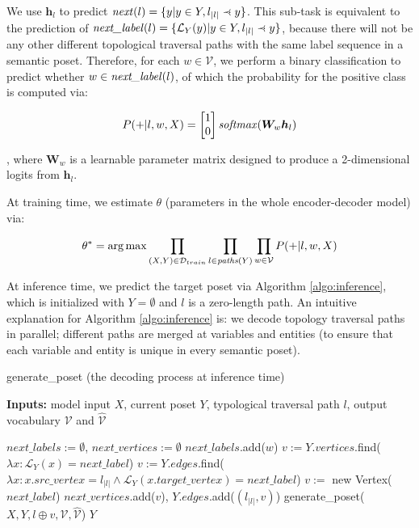 \documentclass{article}
\newcommand{\precdot}{\prec\mathrel{\mkern-5mu}\mathrel{\cdot}}
\begin{document}
We use $\bm{h}_l$ to predict $\text{\emph{next}}(l)=\{y|y\in Y, l_{|l|}\precdot y\}$.
This sub-task is equivalent to the prediction of $\text{\emph{next\_label}}(l)=\{\mathcal{L}_Y(y)|y\in Y, l_{|l|}\precdot y\}$, because there will not be any other different topological traversal paths with the same label sequence in a semantic poset.
Therefore, for each $w\in \mathcal{V}$, we perform a binary classification to predict whether $w\in \text{\emph{next\_label}}(l)$, of which the probability for the positive class is computed via:

\begin{equation}
P(+|l, w, X) = \begin{bmatrix} 1 \\ 0 \end{bmatrix} \text{\emph{softmax}}(\bm{W}_w\bm{h}_l)
\label{eq:classification}
\end{equation}

, where $\bm{W}_w$ is a learnable parameter matrix designed to produce a 2-dimensional logits from $\bm{h}_l$.

At training time, we estimate $\theta$ (parameters in the whole encoder-decoder model) via:

\begin{equation}
\theta^* = \arg\max\prod_{(X,Y)\in\mathcal{D}_{train}}\prod_{l\in\text{\emph{paths}}(Y)}\prod_{w\in\mathcal{V}}P(+|l, w, X)
\end{equation}

At inference time, we predict the target poset via Algorithm \ref{algo:inference}, which is initialized with $Y=\emptyset$ and $l$ is a zero-length path.
An intuitive explanation for Algorithm \ref{algo:inference} is:
we decode topology traversal paths in parallel;
different paths are merged at variables and entities (to ensure that each variable and entity is unique in every semantic poset).

\begin{algorithm}[t]
\caption{generate\_poset (the decoding process at inference time)}
\hspace*{0.02in} {\bf Inputs:}
model input $X$, current poset $Y$, typological traversal path $l$, output vocabulary $\mathcal{V}$ and $\hat{\mathcal{V}}$
\begin{algorithmic}[1]
\State $next\_labels :=\emptyset$, $next\_vertices :=\emptyset$
        \State $next\_labels$.add($w$)
    \EndIf
\EndFor
{} 
        \State $v := Y.vertices$.find($\lambda x:\mathcal{L}_Y(x)=next\_label$)
    \Else
        \State $v := Y.edges$.find($\lambda x:x.src\_vertex=l_{|l|}\wedge\mathcal{L}_Y(x.target\_vertex)=next\_label$)
    \EndIf
        \State $v := $ new Vertex($next\_label$)
    \EndIf
    \State $next\_vertices$.add($v$), $Y.edges$.add($(l_{|l|}, v)$)
\EndFor
{}
    \State generate\_poset($X, Y, l\oplus v, \mathcal{V}, \hat{\mathcal{V}}$)
\EndFor
\State \Return $Y$
\end{algorithmic}
\label{algo:inference}
\end{algorithm}
\end{document}
